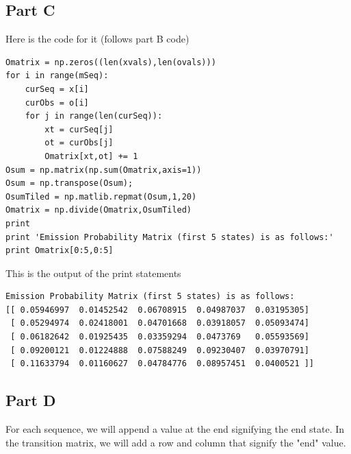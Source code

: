 \documentclass[twoside,11pt]{article}
\theoremstyle{definition}
\begin{document}
\subsection*{Part C}

Here is the code for it (follows part B code)

\begin{lstlisting}
Omatrix = np.zeros((len(xvals),len(ovals)))
for i in range(mSeq):
    curSeq = x[i]
    curObs = o[i]
    for j in range(len(curSeq)):
        xt = curSeq[j]
        ot = curObs[j]
        Omatrix[xt,ot] += 1
Osum = np.matrix(np.sum(Omatrix,axis=1))
Osum = np.transpose(Osum);
OsumTiled = np.matlib.repmat(Osum,1,20)
Omatrix = np.divide(Omatrix,OsumTiled)
print
print 'Emission Probability Matrix (first 5 states) is as follows:'
print Omatrix[0:5,0:5]
\end{lstlisting}

This is the output of the print statements
\begin{lstlisting}
Emission Probability Matrix (first 5 states) is as follows:
[[ 0.05946997  0.01452542  0.06708915  0.04987037  0.03195305]
 [ 0.05294974  0.02418001  0.04701668  0.03918057  0.05093474]
 [ 0.06182642  0.01925435  0.03359294  0.0473769   0.05593569]
 [ 0.09200121  0.01224888  0.07588249  0.09230407  0.03970791]
 [ 0.11633794  0.01160627  0.04784776  0.08957451  0.0400521 ]]
\end{lstlisting}

\subsection*{Part D}

For each sequence, we will append a value at the end signifying the end state. In the transition matrix, we will add a row and column that signify the "end" value. 
\end{document}
